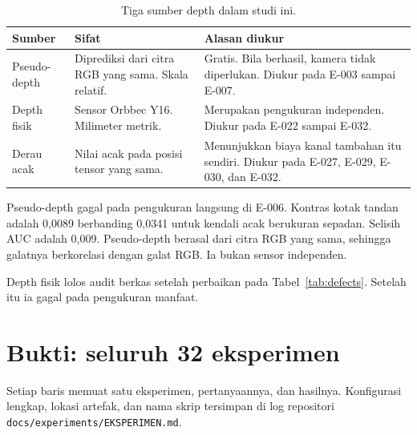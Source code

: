 \documentclass[preprint,12pt]{elsarticle}
\newcommand{\E}[1]{E-#1}
\begin{document}
\begin{table}[H]
\centering
\caption{Tiga sumber depth dalam studi ini.}
\label{tab:depthkinds}
\begin{tabularx}{\columnwidth}{L{0.22\columnwidth}L{0.24\columnwidth}Y}
\toprule
\textbf{Sumber} & \textbf{Sifat} & \textbf{Alasan diukur}\\
\midrule
Pseudo-depth & Diprediksi dari citra RGB yang sama. Skala relatif. & Gratis.
Bila berhasil, kamera tidak diperlukan. Diukur pada \E{003} sampai \E{007}.\\
Depth fisik & Sensor Orbbec Y16. Milimeter metrik. & Merupakan pengukuran
independen. Diukur pada \E{022} sampai \E{032}.\\
Derau acak & Nilai acak pada posisi tensor yang sama. & Menunjukkan biaya kanal
tambahan itu sendiri. Diukur pada \E{027}, \E{029}, \E{030}, dan \E{032}.\\
\bottomrule
\end{tabularx}
\end{table}

Pseudo-depth gagal pada pengukuran langsung di \E{006}. Kontras kotak tandan
adalah 0,0089 berbanding 0,0341 untuk kendali acak berukuran sepadan. Selisih
AUC adalah 0,009. Pseudo-depth berasal dari citra RGB yang sama, sehingga
galatnya berkorelasi dengan galat RGB. Ia bukan sensor independen.

Depth fisik lolos audit berkas setelah perbaikan pada
Tabel~\ref{tab:defects}. Setelah itu ia gagal pada pengukuran manfaat.

\section{Bukti: seluruh 32 eksperimen}
\label{sec:experiments}

Setiap baris memuat satu eksperimen, pertanyaannya, dan hasilnya. Konfigurasi
lengkap, lokasi artefak, dan nama skrip tersimpan di log repositori
\texttt{docs/experiments/EKSPERIMEN.md}.
\end{document}
